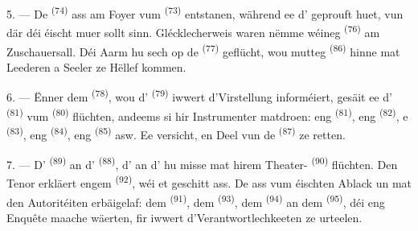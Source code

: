 \VUsaut{5.0mm}
\VUsaut{3.4mm}

5. --- De  \textsuperscript{(74)} ass am Foyer vum 
\textsuperscript{(73)} entstanen, während ee d' geprouft huet, vun där
déi éischt  muer sollt sinn. Glécklecherweis waren nëmme wéineg
 \textsuperscript{(76)} am Zuschauersall. Déi Aarm hu sech op de
 \textsuperscript{(77)} geflücht, wou mutteg 
\textsuperscript{(86)} hinne mat Leederen a Seeler ze Hëllef kommen.

6. --- Ënner dem  \textsuperscript{(78)}, wou d'
\textsuperscript{(79)} iwwert d'Virstellung informéiert, gesäit ee
d' \textsuperscript{(81)} vum 
\textsuperscript{(80)} flüchten, andeems si hir Instrumenter matdroen: eng
 \textsuperscript{(81)}, eng  \textsuperscript{(82)}, e
 \textsuperscript{(83)}, eng  \textsuperscript{(84)},
eng  \textsuperscript{(85)} asw. Ee versicht, en Deel vun de
 \textsuperscript{(87)} ze retten.

7. --- D' \textsuperscript{(89)} an d'
\textsuperscript{(88)}, d' an d' hu misse mat
hirem Theater- \textsuperscript{(90)} flüchten. Den Tenor erkläert engem
 \textsuperscript{(92)}, wéi et geschitt ass. De 
ass vum éischten Ablack un mat den Autoritéiten erbäigelaf: dem
 \textsuperscript{(91)}, dem 
\textsuperscript{(93)}, dem  \textsuperscript{(94)} an dem
 \textsuperscript{(95)}, déi eng Enquête maache
wäerten, fir iwwert d'Verantwortlechkeeten ze urteelen.

\VUsaut{6.0mm}
\VUfilet{22mm}
